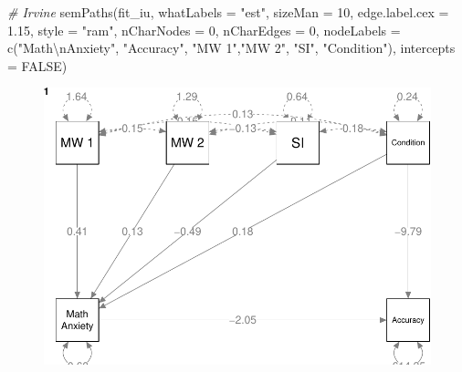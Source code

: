\documentclass[
  letterpaper,
  DIV=11,
  numbers=noendperiod]{scrartcl}
\newenvironment{Shaded}{\begin{snugshade}}{\end{snugshade}}
\newcommand{\AttributeTok}[1]{\textcolor[rgb]{0.49,0.56,0.16}{#1}}
\newcommand{\CommentTok}[1]{\textcolor[rgb]{0.38,0.63,0.69}{\textit{#1}}}
\newcommand{\ConstantTok}[1]{\textcolor[rgb]{0.53,0.00,0.00}{#1}}
\newcommand{\DecValTok}[1]{\textcolor[rgb]{0.25,0.63,0.44}{#1}}
\newcommand{\FloatTok}[1]{\textcolor[rgb]{0.25,0.63,0.44}{#1}}
\newcommand{\FunctionTok}[1]{\textcolor[rgb]{0.02,0.16,0.49}{#1}}
\newcommand{\NormalTok}[1]{\textcolor[rgb]{0.00,0.44,0.13}{#1}}
\newcommand{\SpecialCharTok}[1]{\textcolor[rgb]{0.25,0.44,0.63}{#1}}
\newcommand{\StringTok}[1]{\textcolor[rgb]{0.25,0.44,0.63}{#1}}
\begin{document}
\begin{Shaded}
\begin{Highlighting}[]
\CommentTok{\# Irvine}
\FunctionTok{semPaths}\NormalTok{(fit\_iu,}
         \AttributeTok{whatLabels =} \StringTok{"est"}\NormalTok{,}
         \AttributeTok{sizeMan =} \DecValTok{10}\NormalTok{,}
         \AttributeTok{edge.label.cex =} \FloatTok{1.15}\NormalTok{,}
         \AttributeTok{style =} \StringTok{"ram"}\NormalTok{,}
         \AttributeTok{nCharNodes =} \DecValTok{0}\NormalTok{, }\AttributeTok{nCharEdges =} \DecValTok{0}\NormalTok{,}
         \AttributeTok{nodeLabels =} \FunctionTok{c}\NormalTok{(}\StringTok{"Math}\SpecialCharTok{\textbackslash{}n}\StringTok{Anxiety"}\NormalTok{, }\StringTok{"Accuracy"}\NormalTok{,}
                        \StringTok{"MW 1"}\NormalTok{,}\StringTok{"MW 2"}\NormalTok{, }\StringTok{"SI"}\NormalTok{, }\StringTok{"Condition"}\NormalTok{),}
         \AttributeTok{intercepts =} \ConstantTok{FALSE}\NormalTok{)}
\end{Highlighting}
\end{Shaded}

\begin{figure}[H]

{\centering \includegraphics{sampling_files/figure-pdf/unnamed-chunk-41-3.pdf}

}

\end{figure}
\end{document}
